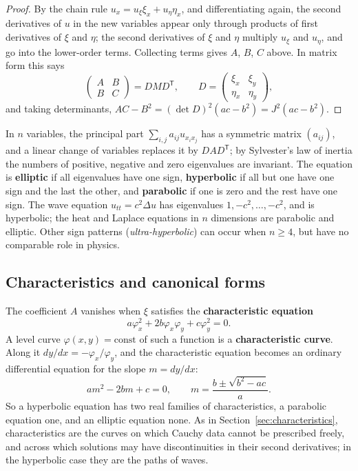 \documentclass[11pt,a4paper]{article}
\numberwithin{equation}{section}
\theoremstyle{definition}
\begin{document}
\begin{proof}
By the chain rule $u_x = u_\xi\xi_x + u_\eta\eta_x$, and differentiating again, the second derivatives of $u$ in the new variables appear only through products of first derivatives of $\xi$ and $\eta$; the second derivatives of $\xi$ and $\eta$ multiply $u_\xi$ and $u_\eta$, and go into the lower-order terms. Collecting
terms gives $A$, $B$, $C$ above. In matrix form this says
\[
\begin{pmatrix} A & B \\ B & C \end{pmatrix} = D M D^{\mathsf T}, \qquad D = \begin{pmatrix} \xi_x & \xi_y \\ \eta_x & \eta_y \end{pmatrix} ,
\]
and taking determinants, $AC - B^2 = (\det D)^2(ac - b^2) = J^2(ac - b^2)$.
\end{proof}

In $n$ variables, the principal part $\sum_{i,j}a_{ij}u_{x_ix_j}$ has a symmetric matrix $(a_{ij})$, and a linear change of variables replaces it by $DAD^{\mathsf T}$; by Sylvester's law of inertia the numbers of positive, negative and zero eigenvalues are invariant. The equation is \textbf{elliptic} if all eigenvalues
have one sign, \textbf{hyperbolic} if all but one have one sign and the last the other, and \textbf{parabolic} if one is zero and the rest have one sign. The wave equation $u_{tt} = c^2\Delta u$ has eigenvalues $1, -c^2, \ldots, -c^2$, and is hyperbolic; the heat and Laplace equations in
$n$ dimensions are parabolic and elliptic. Other sign patterns (\emph{ultra-hyperbolic}) can occur when $n \geq 4$, but have no comparable role in physics.

\subsection{Characteristics and canonical forms}
\label{ssec:canonical}

The coefficient $A$ vanishes when $\xi$ satisfies the \textbf{characteristic equation}
\[
a\varphi_x^2 + 2b\varphi_x\varphi_y + c\varphi_y^2 = 0 .
\]
A level curve $\varphi(x, y) = \text{const}$ of such a function is a \textbf{characteristic curve}. Along it $dy/dx = -\varphi_x/\varphi_y$, and the characteristic equation becomes an ordinary differential equation for the slope $m = dy/dx$:
\[
a m^2 - 2b m + c = 0, \qquad m = \frac{b \pm \sqrt{b^2 - ac}}{a} .
\]
So a hyperbolic equation has two real families of characteristics, a parabolic equation one, and an elliptic equation none. As in Section~\ref{sec:characteristics}, characteristics are the curves on which Cauchy data cannot be prescribed freely, and across which
solutions may have discontinuities in their second derivatives; in the hyperbolic case they are the paths of waves.
\end{document}
